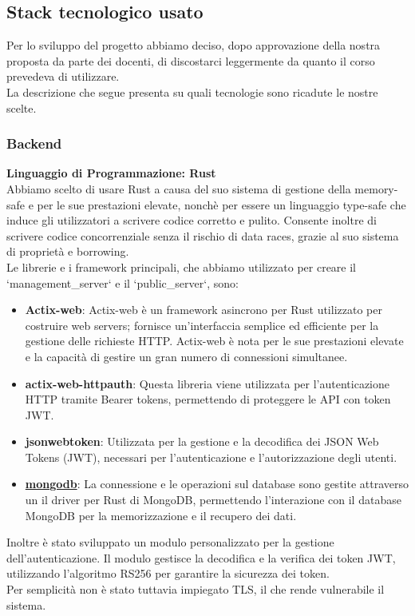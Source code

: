 \documentclass{article}
\begin{document}
\subsection{Stack tecnologico usato}
Per lo sviluppo del progetto abbiamo deciso, dopo approvazione della nostra proposta da parte dei docenti, di discostarci leggermente da quanto il corso prevedeva di utilizzare.\\
La descrizione che segue presenta su quali tecnologie sono ricadute le nostre scelte.

\subsubsection{Backend}
\textbf{Linguaggio di Programmazione: Rust}\\
Abbiamo scelto di usare Rust a causa del suo sistema di gestione della memory-safe e per le sue prestazioni elevate, nonchè per essere un linguaggio type-safe che induce gli utilizzatori a scrivere codice corretto e pulito. Consente inoltre di scrivere codice concorrenziale senza il rischio di data races, grazie al suo sistema di proprietà e borrowing.\\
Le librerie e i framework principali, che abbiamo utilizzato per creare il `management\_server` e il  `public\_server`, sono:
\begin{itemize}
    \item \textbf{Actix-web}: Actix-web è un framework asincrono per Rust utilizzato per costruire web servers; fornisce un'interfaccia semplice ed efficiente per la gestione delle richieste HTTP. Actix-web è nota per le sue prestazioni elevate e la capacità di gestire un gran numero di connessioni simultanee.
    \item \textbf{actix-web-httpauth}: Questa libreria viene utilizzata per l'autenticazione HTTP tramite Bearer tokens, permettendo di proteggere le API con token JWT.
    \item \textbf{jsonwebtoken}: Utilizzata per la gestione e la decodifica dei JSON Web Tokens (JWT), necessari per l'autenticazione e l'autorizzazione degli utenti.
    \item \textbf{\href{https://www.mongodb.com/docs/drivers/rust/current/}{mongodb}}: La connessione e le operazioni sul database sono gestite attraverso un il driver per Rust di MongoDB, permettendo l'interazione con il database MongoDB per la memorizzazione e il recupero dei dati.
\end{itemize}
Inoltre è stato sviluppato un modulo personalizzato per la gestione dell'autenticazione. Il modulo gestisce la decodifica e la verifica dei token JWT, utilizzando l'algoritmo RS256 per garantire la sicurezza dei token.\\
Per semplicità non è stato tuttavia impiegato TLS, il che rende vulnerabile il sistema.\\
\end{document}
